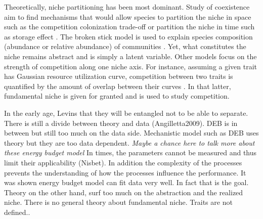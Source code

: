Theoretically, niche partitioning has been most dominant.
Study of coexistence aim to find mechanisms that would allow species to partition the niche in space such as the competition colonization trade-off \citep[e.g.,][]{Levins1971,Tilman1994} or partition the niche in time such as storage effect \citep{Skellam1951, Chesson2000}. %
The broken stick model is used to explain species composition (abundance or relative abundance) of communities \citep{MacArthur1957}.
Yet, what constitutes the niche remains abstract and is simply a latent variable.
Other models focus on the strength of competition along one niche axis.
For instance, assuming a given trait has Gaussian resource utilization curve, competition  between two traits is quantified by the amount of overlap between their curves \citep{MacArthur1967, Roughgarden1979}.%
In that latter, fundamental niche is given for granted and is used to study competition.

In the early age, Levins that they will be entangled not to be able to separate.
There is still a divide between theory and data (Angilletta2009).
DEB is in between but still too much on the data side.
Mechanistic model such as DEB uses theory but they are too data dependent.
\textit{Maybe a chance here to talk more about these energy budget model}
In times, the parameters cannot be measured and thus limit their applicability (Nisbet).
In addition the complexity of the processes prevents the understanding of how the processes influence the performance.
It was shown energy budget model can fit data very well.
In fact that is the goal.
Theory on the other hand, surf too much on the abstraction and the realized niche.
There is no general theory about fundamental niche.
Traits are not defined..

